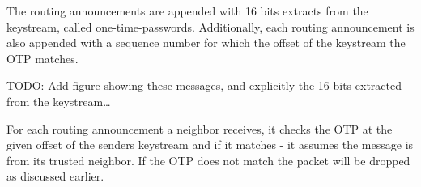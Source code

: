 The routing announcements are appended with 16 bits extracts from the keystream,
called one-time-passwords. Additionally, each routing announcement is also
appended with a sequence number for which the offset of the keystream the
\ac{OTP} matches.

TODO: Add figure showing these messages, and explicitly the 16 bits extracted
from the keystream\ldots

For each routing announcement a neighbor receives, it checks the \ac{OTP} at the
given offset of the senders keystream and if it matches - it assumes the message
is from its trusted neighbor. If the \ac{OTP} does not match the packet will be
dropped as discussed earlier.


